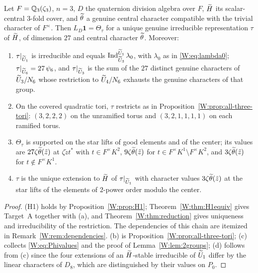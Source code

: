 \begin{theorem}\label{W:thm:main-targetA}
Let $F=\mathbb Q_3(\zeta_3)$, $n=3$, $D$ the quaternion division algebra over
$F$, $\widetilde H$ its scalar-central $3$-fold cover, and $\widetilde\theta$ a genuine
central character compatible with the trivial character of $F^\times$.
Then $L_D\mathbf1=\Theta_\tau$ for a unique genuine irreducible
representation $\tau$ of $\widetilde H$, of dimension $27$ and central character
$\widetilde\theta$.  Moreover:
\begin{enumerate}[label=(\alph*)]
\item $\tau|_{\widetilde U_1}$ is irreducible and equals
$\operatorname{Ind}_{\widetilde U_3}^{\widetilde U_1}\lambda_0$, with $\lambda_0$ as in \eqref{W:eq:lambda0};
$\tau|_{\widetilde U_6}=27\,\psi_6$, and $\tau|_{\widetilde U_3}$ is the sum of the $27$
distinct genuine characters of $\widetilde U_3/N_6$ whose restriction to
$\widetilde U_4/N_6$ exhausts the genuine characters of that group.
\item On the covered quadratic tori, $\tau$ restricts as in
Proposition~\ref{W:prop:all-three-tori}: $(3,2,2,2)$ on the unramified
torus and $(3,2,1,1,1,1)$ on each ramified torus.
\item $\Theta_\tau$ is supported on the star lifts of good elements and
of the center; its values are $27\zeta\widetilde\theta(\tilde z)$ at
$\zeta\tilde zt^*$ with $t\in F^\times K^2$, $9\zeta\widetilde\theta(\tilde z)$ for
$t\in F^\times K^1\setminus F^\times K^2$, and $3\zeta\widetilde\theta(\tilde z)$ for
$t\notin F^\times K^1$.
\item $\tau$ is the unique extension to $\widetilde H$ of $\tau|_{\widetilde U_1}$ with
character values $3\zeta\widetilde\theta(\tilde z)$ at the star lifts of the elements
of $2$-power order modulo the center.
\end{enumerate}
\end{theorem}
\begin{proof}
(H1) holds by Proposition~\ref{W:prop:H1}; Theorem~\ref{W:thm:H1equiv}
gives Target~A together with (a), and Theorem~\ref{W:thm:reduction} gives
uniqueness and irreducibility of the restriction.  The dependencies of
this chain are itemized in Remark~\ref{W:rem:dependencies}.  (b) is
Proposition~\ref{W:prop:all-three-tori}; (c) collects
\eqref{W:eq:Phivalues} and the proof of Lemma~\ref{W:lem:2groups}; (d)
follows from (c) since the four extensions of an $\widetilde H$-stable
irreducible of $\widetilde U_1$ differ by the linear characters of $D_8$, which
are distinguished by their values on $P_0$.
\end{proof}

